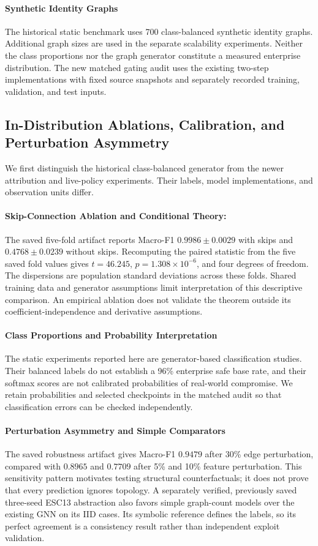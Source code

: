 \paragraph{Synthetic Identity Graphs} The historical static benchmark uses 700 class-balanced synthetic identity graphs. Additional graph sizes are used in the separate scalability experiments. Neither the class proportions nor the graph generator constitute a measured enterprise distribution. The new matched gating audit uses the existing two-step implementations with fixed source snapshots and separately recorded training, validation, and test inputs.

\subsection{In-Distribution Ablations, Calibration, and Perturbation Asymmetry}
We first distinguish the historical class-balanced generator from the newer attribution and live-policy experiments. Their labels, model implementations, and observation units differ.

\paragraph{Skip-Connection Ablation and Conditional Theory:}
The saved five-fold artifact reports Macro-F1 $0.9986 \pm 0.0029$ with skips and $0.4768 \pm 0.0239$ without skips. Recomputing the paired statistic from the five saved fold values gives $t=46.245$, $p=1.308\times10^{-6}$, and four degrees of freedom. The dispersions are population standard deviations across these folds. Shared training data and generator assumptions limit interpretation of this descriptive comparison. An empirical ablation does not validate the theorem outside its coefficient-independence and derivative assumptions.

\paragraph{Class Proportions and Probability Interpretation}
The static experiments reported here are generator-based classification studies. Their balanced labels do not establish a 96\% enterprise safe base rate, and their softmax scores are not calibrated probabilities of real-world compromise. We retain probabilities and selected checkpoints in the matched audit so that classification errors can be checked independently.

\paragraph{Perturbation Asymmetry and Simple Comparators}
The saved robustness artifact gives Macro-F1 $0.9479$ after 30\% edge perturbation, compared with $0.8965$ and $0.7709$ after 5\% and 10\% feature perturbation. This sensitivity pattern motivates testing structural counterfactuals; it does not prove that every prediction ignores topology. A separately verified, previously saved three-seed ESC13 abstraction also favors simple graph-count models over the existing GNN on its IID cases. Its symbolic reference defines the labels, so its perfect agreement is a consistency result rather than independent exploit validation.

